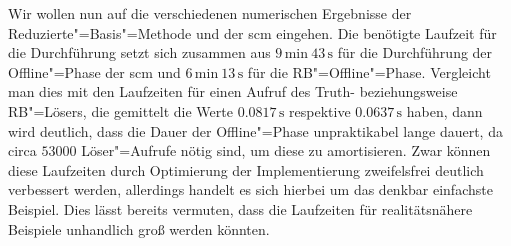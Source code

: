 \documentclass[../main.tex]{subfiles}
\begin{document}
Wir wollen nun auf die verschiedenen numerischen Ergebnisse der Reduzierte"=Basis"=Methode und der \acl{scm} eingehen.
Die benötigte Laufzeit für die Durchführung setzt sich zusammen aus $9\,\mathrm{min}~43\,\mathrm{s}$ für die Durchführung der Offline"=Phase der \ac{scm} und $6\,\mathrm{min}~13\,\mathrm{s}$ für die RB"=Offline"=Phase.
Vergleicht man dies mit den Laufzeiten für einen Aufruf des Truth- beziehungsweise RB"=Lösers, die gemittelt die Werte $0.0817\,\mathrm{s}$ respektive $0.0637\,\mathrm{s}$ haben, dann wird deutlich, dass die Dauer der Offline"=Phase unpraktikabel lange dauert, da circa $53000$ Löser"=Aufrufe nötig sind, um diese zu amortisieren.
Zwar können diese Laufzeiten durch Optimierung der Implementierung zweifelsfrei deutlich verbessert werden, allerdings handelt es sich hierbei um das denkbar einfachste Beispiel.
Dies lässt bereits vermuten, dass die Laufzeiten für realitätsnähere Beispiele unhandlich groß werden könnten.
\end{document}
